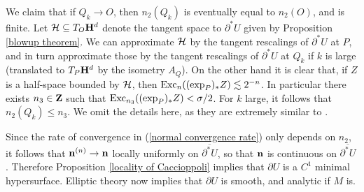We claim that if $Q_k \to O$, then $n_2(Q_k)$ is eventually equal to $n_2(O)$, and is finite.
Let $\mathcal H \subseteq T_O\mathbf H^d$ denote the tangent space to $\partial^* U$ given by Proposition \ref{blowup theorem}.
We can approximate $\mathcal H$ by the tangent rescalings of $\partial^* U$ at $P$, and in turn approximate those by the tangent rescalings of $\partial^* U$ at $Q_k$ if $k$ is large (translated to $T_P \mathbf H^d$ by the isometry $A_Q$).
On the other hand it is clear that, if $Z$ is a half-space bounded by $\mathcal H$, then $\operatorname{Exc}_n((\exp_P)_* Z) \lesssim 2^{-n}$.
In particular there exists $n_3 \in \mathbf{Z}$ such that $\operatorname{Exc}_{n_3}((\exp_P)_* Z) < \sigma/2$.
For $k$ large, it follows that $n_2(Q_k) \leq n_3$.
We omit the details here, as they are extremely similar to \cite[Teorema 4]{Miranda67}.

Since the rate of convergence in (\ref{normal convergence rate}) only depends on $n_2$, it follows that $\mathbf n^{(n)} \to \mathbf n$ locally uniformly on $\overline{\partial^* U}$, so that $\mathbf n$ is continuous on $\overline{\partial^* U}$.
Therefore Proposition \ref{locality of Caccioppoli} implies that $\partial U$ is a $C^1$ minimal hypersurface.
Elliptic theory \cite{morrey2009multiple} now implies that $\partial U$ is smooth, and analytic if $M$ is.
